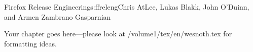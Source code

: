 \begin{aosachapter}{Firefox Release Engineering}{s:ffreleng}{Chris AtLee, Lukas Blakk, John O'Duinn, and Armen Zambrano Gasparnian}

Your chapter goes here---please look at /volume1/tex/en/wesnoth.tex for 
formatting ideas.

\end{aosachapter}
